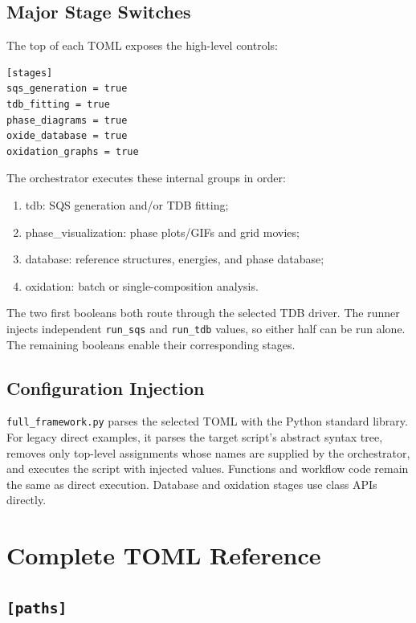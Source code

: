 \documentclass[11pt,letterpaper]{article}
\newcommand{\file}[1]{\nolinkurl{#1}}
\newcommand{\stage}[1]{\textsf{#1}}
\begin{document}
\subsection{Major Stage Switches}

The top of each TOML exposes the high-level controls:
\begin{lstlisting}
[stages]
sqs_generation = true
tdb_fitting = true
phase_diagrams = true
oxide_database = true
oxidation_graphs = true
\end{lstlisting}

The orchestrator executes these internal groups in order:
\begin{enumerate}
  \item \stage{tdb}: SQS generation and/or TDB fitting;
  \item \stage{phase\_visualization}: phase plots/GIFs and grid movies;
  \item \stage{database}: reference structures, energies, and phase database;
  \item \stage{oxidation}: batch or single-composition analysis.
\end{enumerate}

The two first booleans both route through the selected TDB driver. The runner
injects independent \file{run_sqs} and \file{run_tdb} values, so either half
can be run alone. The remaining booleans enable their corresponding stages.

\subsection{Configuration Injection}

\file{full_framework.py} parses the selected TOML with the Python standard
library. For legacy direct examples, it parses the target script's abstract
syntax tree, removes only top-level assignments whose names are supplied by
the orchestrator, and executes the script with injected values. Functions and
workflow code remain the same as direct execution. Database and oxidation
stages use class APIs directly.

\section{Complete TOML Reference}

\subsection{\texttt{[paths]}}
\end{document}
